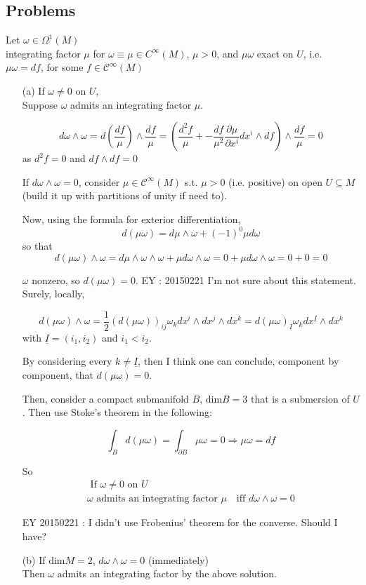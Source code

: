\subsection*{Problems}


Let $\omega \in \Omega^1(M)$ \\
integrating factor $\mu $ for $\omega \equiv \mu \in C^{\infty}(M)$, $\mu > 0$, and $\mu \omega $ exact on $U$, i.e. $\mu \omega = df$, for some $f \in \mathcal{C}^{\infty}(M)$

\begin{enumerate}
\item[(a)] If $\omega \neq 0$ on $U$, \\
Suppose $\omega$ admits an integrating factor $\mu$.  

\[
d\omega \wedge \omega = d\left( \frac{df}{\mu} \right) \wedge \frac{df}{\mu} = \left( \frac{d^2 f}{ \mu} + -\frac{df}{\mu^2} \frac{ \partial \mu }{ \partial x^i } dx^i \wedge df \right) \wedge \frac{df}{\mu} = 0 
\]
as $d^2f =0$ and $df\wedge df =0$

If $d\omega \wedge \omega =0$, consider $\mu \in \mathcal{C}^{\infty}(M)$ s.t. $\mu >0$ (i.e. positive) on open $U\subseteq M$ (build it up with partitions of unity if need to).  

Now, using the formula for exterior differentiation, 
\[
d(\mu \omega) = d\mu \wedge \omega + (-1)^0 \mu d\omega 
\]
so that 
\[
d (\mu \omega) \wedge \omega = d\mu \wedge \omega \wedge \omega + \mu d\omega \wedge \omega = 0 + \mu d\omega \wedge \omega = 0 + 0 = 0 
\]

$\omega$ nonzero, so $d(\mu \omega) =0$.  EY : 20150221 I'm not sure about this statement. Surely, locally,

\[
d(\mu \omega) \wedge \omega = \frac{1}{2} ( d(\mu \omega) )_{ij} \omega_k dx^i \wedge dx^j \wedge dx^k = d(\mu \omega)_{ \underline{I}} \omega_k dx^{\underline{I}} \wedge dx^k
\]
with $\underline{I} = (i_1,i_2)$ and $i_1 < i_2$.  

By considering every $k \neq \underline{I}$, then I think one can conclude, component by component, that $d(\mu \omega) =0$. 

Then, consider a compact submanifold $B$, $\text{dim}{B} =3$ that is a submersion of $U$.  Then use Stoke's theorem in the following:

\[
\int_B d(\mu \omega) = \int_{\partial B} \mu \omega = 0 \Longrightarrow \mu \omega = df
\]

So 
\[
\boxed{ \begin{gathered} \text{ If } \omega \neq 0 \text{ on } U \\
    \omega \text{ admits an integrating factor $\mu$ } \text{ iff } d\omega \wedge \omega  =0  \end{gathered} }
\]

EY 20150221 : I didn't use Frobenius' theorem for the converse.  Should I have?
\item[(b)] If $\text{dim}{M}=2$, $d\omega \wedge \omega =0$ (immediately) \\
Then $\omega $ admits an integrating factor by the above solution.
\end{enumerate}
